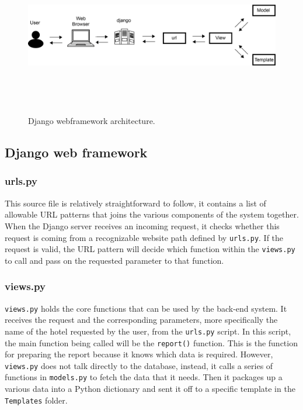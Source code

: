 \documentclass[a4paper]{report}
\newcommand{\code}[1]{\texttt{#1}}
\begin{document}
\begin{figure}[h]
\includegraphics[width=\textwidth, height=7cm, keepaspectratio]{django.png}
\centering
\caption{Django webframework architecture.}
\label{figure:django}
\end{figure}

\subsection{Django web framework}
\subsubsection{urls.py}
This source file is relatively straightforward to follow, it contains a list of allowable URL patterns that joins the various components of the system together. When the Django server receives an incoming request, it checks whether this request is coming from a recognizable website path defined by \code{urls.py}. If the request is valid, the URL pattern will decide which function within the \code{views.py} to call and pass on the requested parameter to that function.

\subsubsection{views.py}
\code{views.py} holds the core functions that can be used by the back-end system. It receives the request and the corresponding parameters, more specifically the name of the hotel requested by the user, from the \code{urls.py} script. In this script, the main function being called will be the \code{report()} function. This is the function for preparing the report because it knows which data is required. However, \code{views.py} does not talk directly to the database, instead, it calls a series of functions in \code{models.py} to fetch the data that it needs. Then it packages up a various data into a Python dictionary and sent it off to a specific template in the \code{Templates} folder.
\end{document}
